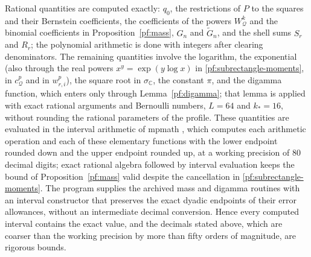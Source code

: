 \documentclass[11pt]{amsart}
\numberwithin{equation}{section}
\theoremstyle{definition}
\theoremstyle{remark}
\newcommand{\C}{\mathbb C}
\begin{document}
Rational quantities are computed exactly: $q_0$, the restrictions of
$P$ to the squares and their Bernstein coefficients, the coefficients
of the powers $W_{\mathcal Q}^k$ and the binomial coefficients in
Proposition~\ref{pf:mass}, $G_n$ and $\widetilde G_n$, and the shell
sums $S_r$ and $R_r$; the polynomial arithmetic is done with integers
after clearing denominators. The remaining quantities involve the
logarithm, the exponential (also through the real powers
$x^y=\exp(y\log x)$ in \eqref{pf:subrectangle-moments}, in
$c_{\mathcal Q}^p$ and in $w_{r,i}^p$), the square root in $\sigma_\C$,
the constant $\pi$, and the digamma function, which enters only through
Lemma~\ref{pf:digamma}; that lemma is applied with exact rational
arguments and Bernoulli numbers, $L=64$ and $k_*=16$, without rounding
the rational parameters of the profile. These quantities are evaluated
in the interval arithmetic of mpmath \cite{Mpmath}, which computes each
arithmetic operation and each of these elementary functions with the
lower endpoint rounded down and the upper endpoint rounded up, at a
working precision of $80$ decimal digits; exact rational algebra
followed by interval evaluation keeps the bound of
Proposition~\ref{pf:mass} valid despite the cancellation in
\eqref{pf:subrectangle-moments}. The program supplies the archived mass
and digamma routines with an interval constructor that preserves the exact
dyadic endpoints of their error allowances, without an intermediate
decimal conversion. Hence every computed interval contains
the exact value, and the decimals stated above, which are coarser than
the working precision by more than fifty orders of magnitude, are
rigorous bounds.
\end{document}
